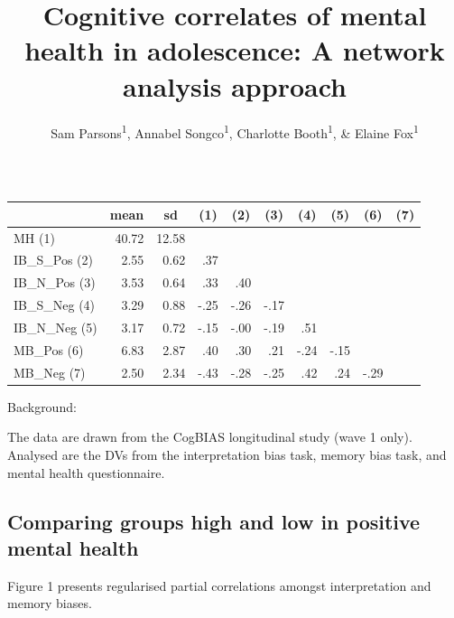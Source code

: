 \documentclass[man,floatsintext]{apa6}
\title{Cognitive correlates of mental health in adolescence: A network analysis approach}
\author{Sam Parsons\textsuperscript{1}, Annabel Songco\textsuperscript{1}, Charlotte Booth\textsuperscript{1}, \& Elaine Fox\textsuperscript{1}}
\date{}
\affiliation{
\vspace{0.5cm}
\textsuperscript{1} University of Oxford}
\begin{document}
\maketitle

\begin{table}[tbp]
\begin{center}
\begin{threeparttable}
\caption{\label{tab:table1}}
\begin{tabular}{lrrrrrrrrr}
\toprule
 & \multicolumn{1}{c}{mean} & \multicolumn{1}{c}{sd} & \multicolumn{1}{c}{       (1)} & \multicolumn{1}{c}{       (2)} & \multicolumn{1}{c}{       (3)} & \multicolumn{1}{c}{       (4)} & \multicolumn{1}{c}{       (5)} & \multicolumn{1}{c}{       (6)} & \multicolumn{1}{c}{       (7)}\\
\midrule
MH (1) & 40.72 & 12.58 &  &  &  &  &  &  & \\
IB\_S\_Pos (2) & 2.55 & 0.62 & .37 &  &  &  &  &  & \\
IB\_N\_Pos (3) & 3.53 & 0.64 & .33 & .40 &  &  &  &  & \\
IB\_S\_Neg (4) & 3.29 & 0.88 & -.25 & -.26 & -.17 &  &  &  & \\
IB\_N\_Neg (5) & 3.17 & 0.72 & -.15 & -.00 & -.19 & .51 &  &  & \\
MB\_Pos (6) & 6.83 & 2.87 & .40 & .30 & .21 & -.24 & -.15 &  & \\
MB\_Neg (7) & 2.50 & 2.34 & -.43 & -.28 & -.25 & .42 & .24 & -.29 & \\
\bottomrule
\end{tabular}
\end{threeparttable}
\end{center}
\end{table}

Background:

The data are drawn from the CogBIAS longitudinal study (wave 1 only). Analysed are the DVs from the interpretation bias task, memory bias task, and mental health questionnaire.

\hypertarget{comparing-groups-high-and-low-in-positive-mental-health}{%
\subsection{Comparing groups high and low in positive mental health}\label{comparing-groups-high-and-low-in-positive-mental-health}}

Figure 1 presents regularised partial correlations amongst interpretation and memory biases.
\end{document}
